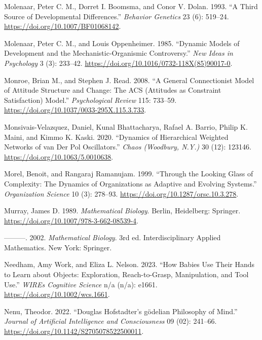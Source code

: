 \documentclass[
  a4paper,
  DIV=11,
  numbers=noendperiod,
  oneside]{scrreprt}
\newlength{\cslhangindent}
\newenvironment{CSLReferences}[2] %
 {\begin{list}{}{%
  \setlength{\itemindent}{0pt}
  \setlength{\leftmargin}{0pt}
  \setlength{\parsep}{0pt}
  \ifodd #1
   \setlength{\leftmargin}{\cslhangindent}
   \setlength{\itemindent}{-1\cslhangindent}
  \fi
  \setlength{\itemsep}{#2\baselineskip}}}
 {\end{list}}
\begin{document}
\begin{CSLReferences}{1}{0}
Molenaar, Peter C. M., Dorret I. Boomsma, and Conor V. Dolan. 1993. {``A
Third Source of Developmental Differences.''} \emph{Behavior Genetics}
23 (6): 519--24. \url{https://doi.org/10.1007/BF01068142}.

Molenaar, Peter C. M., and Louis Oppenheimer. 1985. {``Dynamic Models of
Development and the Mechanistic-Organismic Controversy.''} \emph{New
Ideas in Psychology} 3 (3): 233--42.
\url{https://doi.org/10.1016/0732-118X(85)90017-0}.

Monroe, Brian M., and Stephen J. Read. 2008. {``A General Connectionist
Model of Attitude Structure and Change: {The ACS} ({Attitudes} as
{Constraint Satisfaction}) Model.''} \emph{Psychological Review} 115:
733--59. \url{https://doi.org/10.1037/0033-295X.115.3.733}.

Monsivais-Velazquez, Daniel, Kunal Bhattacharya, Rafael A. Barrio,
Philip K. Maini, and Kimmo K. Kaski. 2020. {``Dynamics of Hierarchical
Weighted Networks of van Der {Pol} Oscillators.''} \emph{Chaos
(Woodbury, N.Y.)} 30 (12): 123146.
\url{https://doi.org/10.1063/5.0010638}.

Morel, Benoit, and Rangaraj Ramanujam. 1999. {``Through the {Looking
Glass} of {Complexity}: {The Dynamics} of {Organizations} as {Adaptive}
and {Evolving Systems}.''} \emph{Organization Science} 10 (3): 278--93.
\url{https://doi.org/10.1287/orsc.10.3.278}.

Murray, James D. 1989. \emph{Mathematical Biology}. Berlin, Heidelberg:
Springer. \url{https://doi.org/10.1007/978-3-662-08539-4}.

---------. 2002. \emph{Mathematical Biology}. 3rd ed. Interdisciplinary
Applied Mathematics. {New York}: {Springer}.

Needham, Amy Work, and Eliza L. Nelson. 2023. {``How Babies Use Their
Hands to Learn about Objects: {Exploration}, Reach-to-Grasp,
Manipulation, and Tool Use.''} \emph{WIREs Cognitive Science} n/a (n/a):
e1661. \url{https://doi.org/10.1002/wcs.1661}.

Nenu, Theodor. 2022. {``Douglas Hofstadter{'}s g{ö}delian Philosophy of
Mind.''} \emph{Journal of Artificial Intelligence and Consciousness} 09
(02): 241--66. \url{https://doi.org/10.1142/S2705078522500011}.


\end{CSLReferences}
\end{document}
